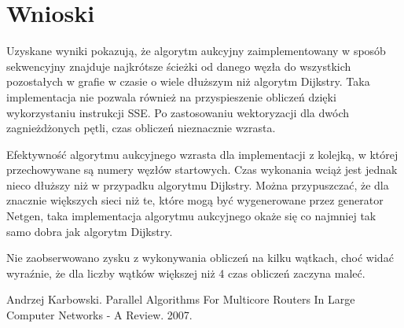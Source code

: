 \documentclass[12pt,a4paper]{article}
\begin{document}
\section{Wnioski}
Uzyskane wyniki pokazują, że algorytm aukcyjny zaimplementowany w sposób sekwencyjny znajduje najkrótsze ścieżki od danego węzła do wszystkich pozostałych w grafie w czasie o wiele dłuższym niż algorytm Dijkstry. Taka implementacja nie pozwala również na przyspieszenie obliczeń dzięki wykorzystaniu instrukcji SSE. Po zastosowaniu wektoryzacji dla dwóch zagnieżdżonych pętli, czas obliczeń nieznacznie wzrasta.

Efektywność algorytmu aukcyjnego wzrasta dla implementacji z kolejką, w której przechowywane są numery węzłów startowych. Czas wykonania wciąż jest jednak nieco dłuższy niż w przypadku algorytmu Dijkstry. Można przypuszczać, że dla znacznie większych sieci niż te, które mogą być wygenerowane przez generator Netgen, taka implementacja algorytmu aukcyjnego okaże się co najmniej tak samo dobra jak algorytm Dijkstry.

Nie zaobserwowano zysku z wykonywania obliczeń na kilku wątkach, choć widać wyraźnie, że dla liczby wątków większej niż 4 czas obliczeń zaczyna maleć.
\begin{thebibliography}{1}
Andrzej Karbowski. Parallel Algorithms For Multicore Routers In Large Computer Networks - A Review. 2007.
\end{thebibliography}
\end{document}
